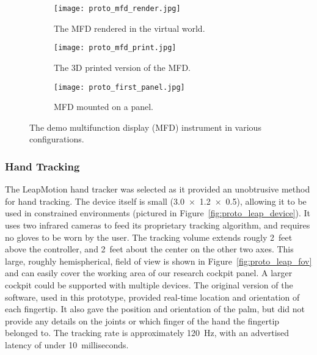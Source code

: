 \mbox{}\hfill
\begin{figure}
    \centering
    \begin{subfigure}[t]{0.3\linewidth}
        \centering
        \texttt{[image: proto\_mfd\_render.jpg]}
        \caption{The MFD rendered in the virtual world.}
        \label{fig:proto_mfd_render}
    \end{subfigure}\hfill
    \begin{subfigure}[t]{0.3\linewidth}
        \centering
        \texttt{[image: proto\_mfd\_print.jpg]}
        \caption{The 3D printed version of the MFD.}
        \label{fig:proto_mfd_print}
    \end{subfigure}\hfill
    \begin{subfigure}[t]{0.3\linewidth}
        \centering
        \texttt{[image: proto\_first\_panel.jpg]}
        \caption{MFD mounted on a panel.}
        \label{fig:proto_first_panel}
    \end{subfigure}
    \caption{The demo multifunction display (MFD) instrument in various configurations.}
    \label{fig:proto_mfd}
\end{figure}
\hfill\mbox{}


\subsubsection{Hand Tracking}

The LeapMotion hand tracker was selected as it provided an unobtrusive method for hand tracking.
The device itself is small (\SI{3.0 x 1.2 x 0.5}{\inch}), allowing it to be used in constrained environments (pictured in Figure~\ref{fig:proto_leap_device}).
It uses two infrared cameras to feed its proprietary tracking algorithm, and requires no gloves to be worn by the user.
The tracking volume extends rougly \num{2}~feet above the controller, and \num{2}~feet about the center on the other two axes.
This large, roughly hemispherical, field of view is shown in Figure~\ref{fig:proto_leap_fov} and can easily cover the working area of our research cockpit panel.
A larger cockpit could be supported with multiple devices.
The original version of the software, used in this prototype, provided real-time location and orientation of each fingertip.
It also gave the position and orientation of the palm, but did not provide any details on the joints or which finger of the hand the fingertip belonged to.
The tracking rate is approximately \SI{120}{\hertz}, with an advertised latency of under \num{10}~milliseconds.

